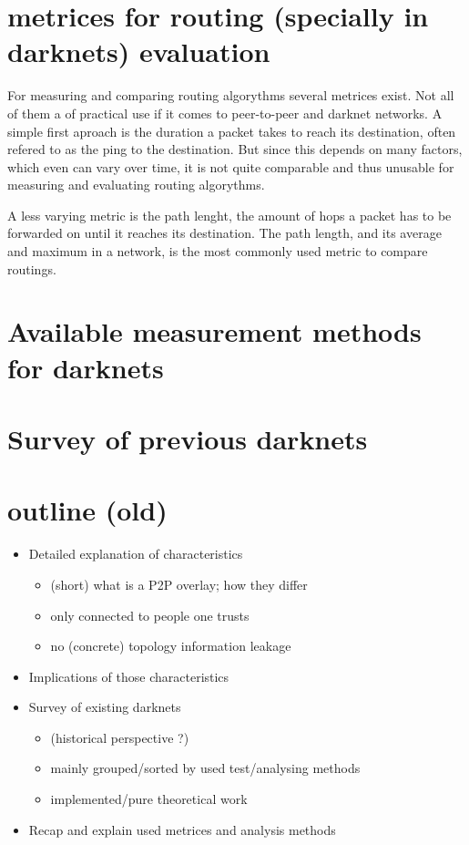 \section{metrices for routing (specially in darknets) evaluation}

For measuring and comparing routing algorythms several metrices exist. Not all of them a of practical use if it comes to peer-to-peer and darknet networks. A simple first aproach  is the duration a packet takes to reach its destination, often refered to as the ping to the destination. But since this depends on many factors, which even can vary over time, it is not quite comparable and thus unusable for measuring and evaluating routing algorythms.

A less varying metric is the path lenght, the amount of hops a packet has to be forwarded on until it reaches its destination. The path length, and its average and maximum in a network, is the most commonly used metric to compare routings.



\section{Available measurement methods for darknets}

\section{Survey of previous darknets}

\section{outline (old)}
\begin{itemize}
\item    Detailed explanation of characteristics
\begin{itemize}
\item        (short) what is a P2P overlay; how they differ
\item        only connected to people one trusts
\item        no (concrete) topology information leakage
\end{itemize}
\item    Implications of those characteristics
\item    Survey of existing darknets
\begin{itemize}
\item        (historical perspective ?)
\item        mainly grouped/sorted by used test/analysing methods
\item        implemented/pure theoretical work
\end{itemize}
\item    Recap and explain used metrices and analysis methods
\end{itemize}
